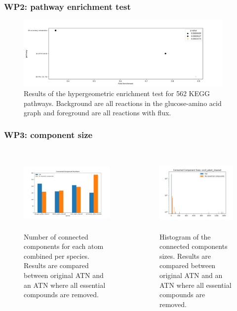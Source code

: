 \documentclass[serif,10pt,aspectratio=169]{beamer}
\begin{document}
\begin{frame}\frametitle{WP2: pathway enrichment test}
	\begin{figure}
		\includegraphics[width=0.95\textwidth]{images/fold_enrichment.png}
		\caption{Results of the hypergeometric enrichment test for 562 KEGG pathways. Background are all reactions in the glucose-amino acid graph and foreground are all reactions with flux.}
	\end{figure}
\end{frame}

\begin{frame}\frametitle{WP3: component size}
	\begin{columns}[t]
		\begin{figure}
			\includegraphics[height=4cm]{images/04_component_numbers.png}
			\caption{Number of connected components for each atom combined per species. Results are compared between original ATN and an ATN where all essential compounds are removed.}
		\end{figure}
		\begin{figure}
			\includegraphics[height=4cm]{images/ecoli_adam_cleaned.png}
			\caption{Histogram of the connected components sizes.  Results are compared between original ATN and an ATN where all essential compounds are removed.}
	\end{figure}
	\end{columns}
\end{frame}
\end{document}
